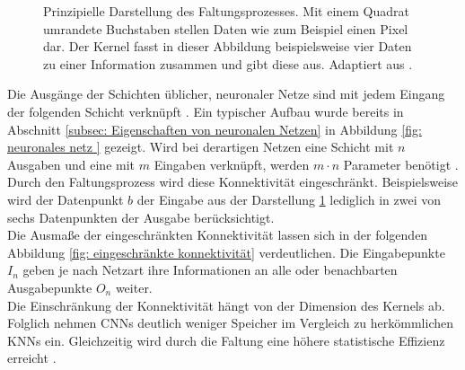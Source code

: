 \begin{figure}[H]
			\caption{Prinzipielle Darstellung des Faltungsprozesses. Mit einem Quadrat umrandete Buchstaben stellen Daten wie zum Beispiel einen Pixel dar. Der Kernel fasst in dieser Abbildung beispielsweise vier Daten zu einer Information zusammen und gibt diese aus. Adaptiert aus \cite{deeplearning}.}
			\label{fig: faltung }
		\end{figure}
		
		
	
		
	
		Die Ausgänge der Schichten üblicher, neuronaler Netze sind mit jedem Eingang der folgenden Schicht verknüpft \cite{deeplearning}. Ein typischer Aufbau wurde bereits in Abschnitt \ref{subsec: Eigenschaften von neuronalen Netzen} in Abbildung \ref{fig: neuronales netz } gezeigt. Wird bei derartigen Netzen eine Schicht mit $n$ Ausgaben und eine mit $m$ Eingaben verknüpft, werden $m \cdot n$ Parameter benötigt \cite{deeplearning}.\\
		
		Durch den Faltungsprozess wird diese Konnektivität eingeschränkt. Beispielsweise wird der Datenpunkt $b$ der Eingabe aus der Darstellung \ref{fig: faltung } lediglich in zwei von sechs Datenpunkten der Ausgabe berücksichtigt.\\
		
		Die Ausmaße der eingeschränkten Konnektivität lassen sich in der folgenden Abbildung \ref{fig: eingeschränkte konnektivität} verdeutlichen. Die Eingabepunkte $I_n$ geben je nach Netzart ihre Informationen an alle oder benachbarten Ausgabepunkte $O_n$ weiter.\\
		
		Die Einschränkung der Konnektivität hängt von der Dimension des Kernels ab. Folglich nehmen CNNs deutlich weniger Speicher im Vergleich zu herkömmlichen KNNs ein\cite{deeplearning}. Gleichzeitig wird durch die Faltung eine höhere statistische Effizienz erreicht \cite{deeplearning}.\\
		
